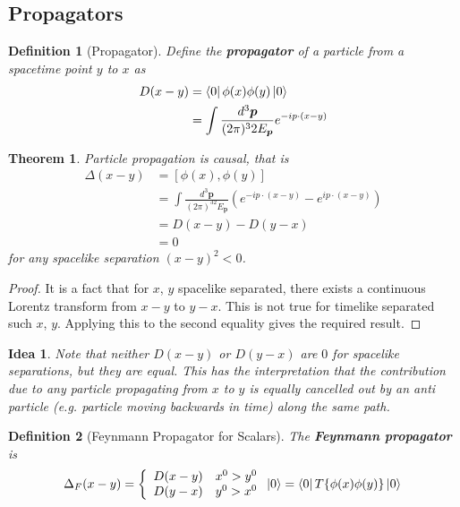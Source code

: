 \documentclass{article}
\newtheorem{theorem}{Theorem}[subsection]
\newtheorem{definition}{Definition}[subsection]
\newtheorem*{idea}{Idea}
\newcommand{\tmeas}{\frac{d^3\bm{p}}{(2\pi)^3}}
\newcommand{\LImeas}{\frac{d^3\bm{p}}{(2\pi)^32E_{\bm{p}}}}
\newcommand{\bam}[1]{\textbf{#1}}
\newcommand{\comm}[2][]{\left[ #1, #2 \right]} %
\begin{document}
\subsection{Propagators}

\begin{definition}[Propagator]
Define the \bam{propagator} of a particle from a spacetime point $y$ to $x$ as 
\begin{align*}
D(x-y) &= \bra{0} \phi(x) \phi(y) \ket{0} \\
  &= \int \LImeas e^{-ip\cdot(x-y)}
\end{align*}
\end{definition}

\begin{theorem}
Particle propagation is causal, that is 
\begin{align*}
    \Delta(x-y) &= \comm[\phi(x)]{\phi(y)} \\
     &= \int \LImeas \left( e^{-ip\cdot(x-y)} - e^{ip\cdot(x-y)} \right) \\
     &= D(x-y) - D(y-x) \\
     &= 0 
\end{align*}
for any spacelike separation $(x-y)^2 <0$. 
\end{theorem}
\begin{proof}
It is a fact that for $x$, $y$ spacelike separated, there exists a continuous Lorentz transform from $x-y$ to $y-x$. This is not true for timelike separated such $x$, $y$. Applying this to the second equality gives the required result. 
\end{proof}

\begin{idea}
Note that neither $D(x-y)$ or $D(y-x)$ are $0$ for spacelike separations, but they are equal. This has the interpretation that the contribution due to any particle propagating from $x$ to $y$ is equally cancelled out by an anti particle (e.g. particle moving backwards in time) along the same path.
\end{idea}

\begin{definition}[Feynmann Propagator for Scalars]
The \bam{Feynmann propagator} is 
\[
\Delta_F(x-y) = \left\{ \begin{array}{lc} D(x-y) & x^0 > y^0 \\
    D(y-x) & y^0 > x^0 
    \end{array} \right. \ket{0} = \bra{0} T\{\phi(x) \phi(y) \} \ket{0} \\
\]
\end{definition}
\end{document}
